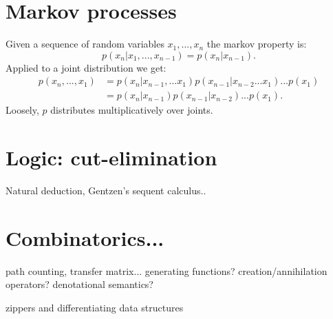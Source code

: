 \documentclass[11pt]{article}
\begin{document}
%
%

\section{Markov processes}

Given a sequence of random variables $x_1,...,x_n$
the markov property is:
$$
    p(x_n|x_1,...,x_{n-1}) = p(x_n|x_{n-1}).
$$
Applied to a joint distribution we get:
\begin{align*}
    p(x_n,...,x_1) &= p(x_n|x_{n-1},...x_1) p(x_{n-1}|x_{n-2}...x_1)...p(x_1)\\
                    &= p(x_n|x_{n-1}) p(x_{n-1}|x_{n-2})...p(x_1).
\end{align*}
Loosely, $p$ distributes multiplicatively over joints.


%
%

\section{Logic: cut-elimination}

Natural deduction, Gentzen's sequent calculus..

%
%

\section{Combinatorics...}

path counting, transfer matrix...
generating functions? 
creation/annihilation operators?
denotational semantics?

zippers and differentiating data structures



%
%
\end{document}
